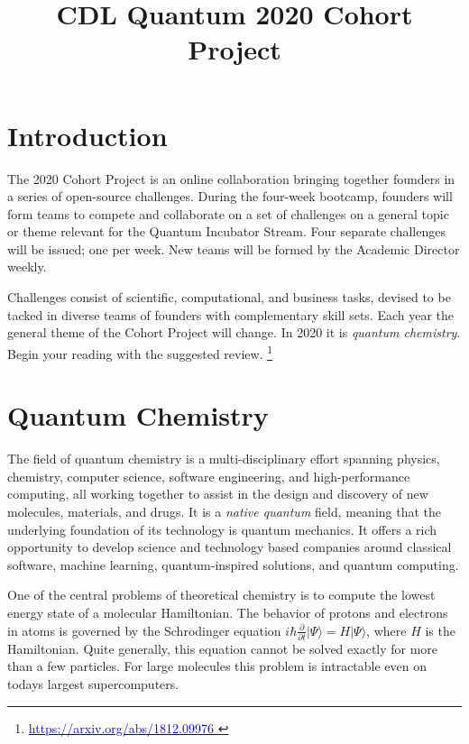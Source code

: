 \documentclass[12pt]{article}
\title{CDL Quantum 2020 Cohort Project}
\begin{document}
\maketitle

\thispagestyle{empty}
\section{Introduction}

The 2020 Cohort Project is an online collaboration bringing together founders in a series of open-source challenges.
During the four-week bootcamp, founders will form teams to compete and collaborate on a set of challenges on a general topic or theme
relevant for the Quantum Incubator Stream.  Four separate challenges will be issued; one per week.  New teams will be formed by the Academic Director weekly.

Challenges consist of scientific, computational, and business tasks, devised to be tacked in diverse teams of founders with complementary skill sets.  Each year
the general theme of the Cohort Project will change.  In 2020 it is {\it quantum chemistry}.  Begin your reading with the suggested review.
\footnote{\href{https://arxiv.org/abs/1812.09976}{\textcolor{blue}{https://arxiv.org/abs/1812.09976} }}


\section{Quantum Chemistry}

The field of quantum chemistry is a multi-disciplinary effort spanning physics, chemistry, computer science, software engineering, and high-performance computing,
all working together to assist in the design and discovery of new molecules, materials, and drugs.  It is a {\it native quantum} field, meaning that the underlying
foundation of its technology is quantum mechanics. It offers a rich opportunity to develop science and technology 
based companies around classical software, machine learning, quantum-inspired solutions, and quantum computing.

One of the central problems of theoretical chemistry is to compute the lowest energy state of a molecular Hamiltonian. 
The behavior of protons and electrons in atoms is governed by the Schrodinger equation 
$i \hbar \frac{\partial }{ \partial t}  | \Psi \rangle = H | \Psi \rangle$, where $H$ is the Hamiltonian.
Quite generally, this equation cannot be solved exactly for more than a few particles.  
For large molecules this problem is intractable even on todays largest supercomputers. 
\end{document}
